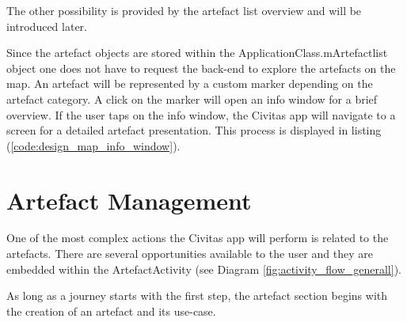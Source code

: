 The other possibility is provided by the artefact list overview and will be introduced later.

Since the artefact objects are stored within the ApplicationClass.mArtefactlist object one does not have to request the back-end to explore the artefacts on the map. 
An artefact will be represented by a custom marker depending on the artefact category. A click on the marker will open an info window for a brief overview. If the user taps on the info window, the Civitas app will navigate to a screen for a detailed artefact presentation. This process is displayed in listing (\ref{code:design_map_info_window}).

\begin{mdframed}

\end{mdframed}



\section{Artefact Management}
One of the most complex actions the Civitas app will perform is related to the artefacts. There are several opportunities available to the user and they are embedded within the ArtefactActivity (see Diagram \ref{fig:activity_flow_generall}). 

As long as a journey starts with the first step, the artefact section begins with the creation of an artefact and its use-case.

